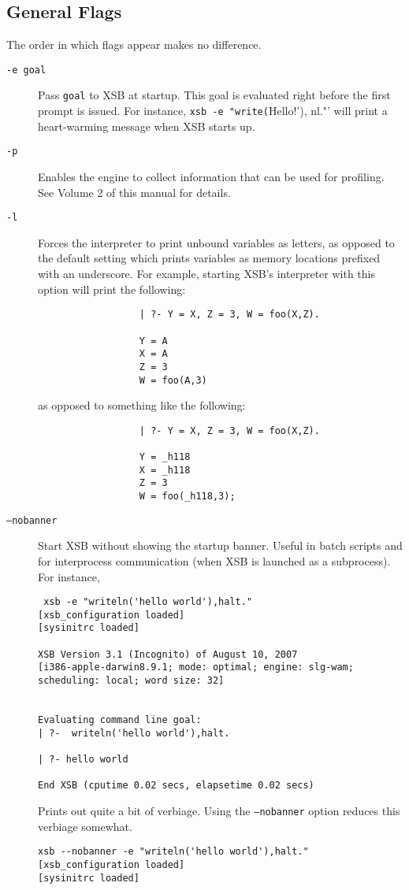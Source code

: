 \subsection{General Flags}
The order in which flags appear makes no difference.
\begin{description}
\item[{\tt -e goal}] Pass {\tt goal}  to XSB at startup. This goal is evaluated
    right before the first prompt is issued. For instance, 
    \verb'xsb -e "write('Hello!'), nl."'
    will print a heart-warming message when XSB starts up.
%
\item[{\tt -p}] Enables the engine to collect information that can be
  used for profiling.  See Volume 2 of this manual for details.
%
\item[{\tt -l}] Forces the interpreter to print unbound variables as
	letters, as opposed to the default setting which prints
	variables as memory locations prefixed with an underscore.
	For example, starting XSB's interpreter with this option will
	print the following:
        \begin{verbatim}
                  | ?- Y = X, Z = 3, W = foo(X,Z).

                  Y = A
                  X = A
                  Z = 3
                  W = foo(A,3)
	\end{verbatim}
	as opposed to something like the following:
	\begin{verbatim}
                  | ?- Y = X, Z = 3, W = foo(X,Z).

                  Y = _h118
                  X = _h118
                  Z = 3
                  W = foo(_h118,3);
	\end{verbatim}
  \item[{\tt --nobanner}] Start XSB without showing the startup banner.
    Useful in batch scripts and for interprocess communication (when XSB is
    launched as a subprocess).  For instance, 
\begin{verbatim}
 xsb -e "writeln('hello world'),halt."
[xsb_configuration loaded]
[sysinitrc loaded]

XSB Version 3.1 (Incognito) of August 10, 2007
[i386-apple-darwin8.9.1; mode: optimal; engine: slg-wam; scheduling: local; word size: 32]


Evaluating command line goal:  
| ?-  writeln('hello world'),halt.

| ?- hello world

End XSB (cputime 0.02 secs, elapsetime 0.02 secs)
\end{verbatim}
Prints out quite a bit of verbiage.  Using the {\tt --nobanner} option
reduces this verbiage somewhat.
\begin{verbatim}
xsb --nobanner -e "writeln('hello world'),halt."
[xsb_configuration loaded]
[sysinitrc loaded]


\end{verbatim}
\end{description}
